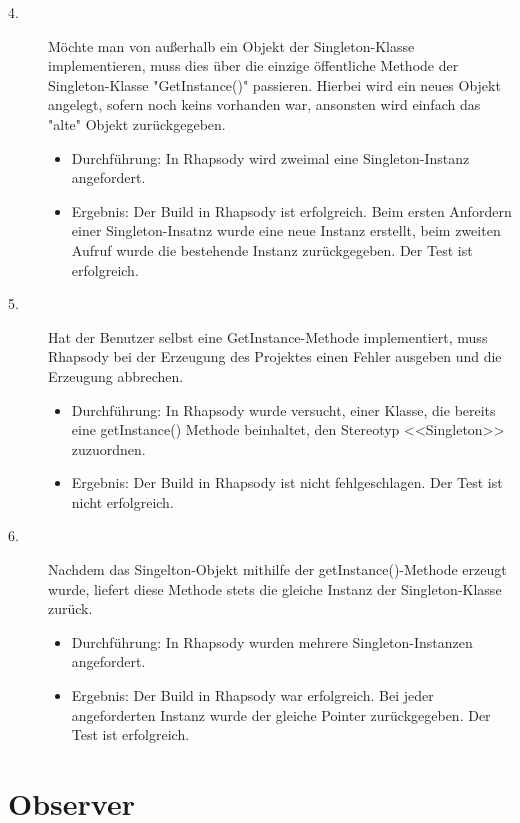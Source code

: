 \begin{description}
  \item[4.]
  Möchte man von außerhalb ein Objekt der Singleton-Klasse implementieren, muss dies über die einzige öffentliche Methode der Singleton-Klasse "GetInstance()" passieren. Hierbei wird ein neues Objekt angelegt, sofern noch keins vorhanden war, ansonsten wird einfach das "alte" Objekt zurückgegeben.
  \begin{itemize}
  	\item{Durchführung:}
  	In Rhapsody wird zweimal eine Singleton-Instanz angefordert.
  	\item{Ergebnis:}
  	Der Build in Rhapsody ist erfolgreich. Beim ersten Anfordern einer
  	Singleton-Insatnz wurde eine neue Instanz erstellt, beim zweiten Aufruf wurde
  	die bestehende Instanz zurückgegeben.
  	Der Test ist erfolgreich.
  \end{itemize}
  
  \item[5.]
  Hat der Benutzer selbst eine GetInstance-Methode implementiert, muss Rhapsody bei der Erzeugung des Projektes einen Fehler ausgeben und die Erzeugung abbrechen.
  \begin{itemize}
  \item{Durchführung:}
  In Rhapsody wurde versucht, einer Klasse, die bereits eine getInstance()
  Methode beinhaltet, den Stereotyp <<Singleton>> zuzuordnen.
  \item{Ergebnis:}
  Der Build in Rhapsody ist nicht fehlgeschlagen. Der Test ist nicht
  erfolgreich.
  \end{itemize}
  
  \item[6.]
  Nachdem das Singelton-Objekt mithilfe der getInstance()-Methode erzeugt wurde, liefert diese Methode stets die gleiche Instanz der Singleton-Klasse zurück. 
  \begin{itemize}
  	\item{Durchführung:}
  	In Rhapsody wurden mehrere Singleton-Instanzen angefordert.
  	\item{Ergebnis:}
  	Der Build in Rhapsody war erfolgreich. Bei jeder angeforderten Instanz
  	wurde der gleiche Pointer zurückgegeben. Der Test ist erfolgreich.
  \end{itemize} 
   
\end{description}

\section{Observer}

